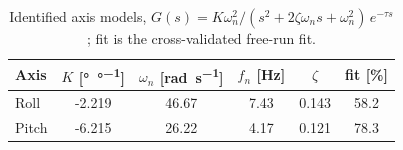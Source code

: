 \begin{table}[!ht]
\centering
\caption{Identified axis models, $G(s)=K\omega_n^2/(s^2+2\zeta\omega_n s+\omega_n^2)\,e^{-\tau s}$; fit is the cross-validated free-run fit.}
\label{tab:models}
\begin{tabular}{lccccc}
\toprule
Axis & $K$ [\si{\degree\per\degree}] & $\omega_n$ [\si{\radian\per\second}] & $f_n$ [\si{\hertz}] & $\zeta$ & fit [\%] \\
\midrule
Roll & -2.219 & 46.67 & 7.43 & 0.143 & 58.2 \\
Pitch & -6.215 & 26.22 & 4.17 & 0.121 & 78.3 \\
\bottomrule
\end{tabular}
\end{table}
